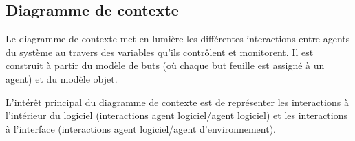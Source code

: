 \subsection{Diagramme de contexte}

	Le diagramme de contexte met en lumière les différentes interactions entre 
	agents du système au travers des variables qu'ils contrôlent et monitorent. 
	Il est construit à partir du modèle de buts (où chaque but feuille est 
	assigné à un agent) et du modèle objet.
	
	L'intérêt principal du diagramme de contexte est de représenter les interactions
	à l'intérieur du logiciel (interactions agent logiciel/agent logiciel) et
	les interactions à l'interface (interactions agent logiciel/agent
	d'environnement).
	
